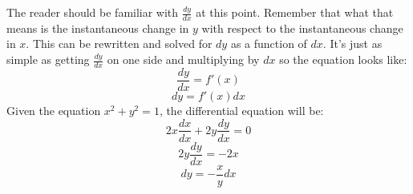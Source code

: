 \documentclass[../revisedmain.tex]{subfiles}
\begin{document}
	The reader should be familiar with $\displaystyle\frac{dy}{dx}$ at this point. Remember that what that means is the instantaneous change in $y$ with respect to the instantaneous change in $x$. This can be rewritten and solved for $dy$ as a function of $dx$. It's just as simple as getting $\displaystyle\frac{dy}{dx}$ on one side and multiplying by $dx$ so the equation looks like: $$\frac{dy}{dx}=f'(x)$$$$dy=f'(x)dx$$ Given the equation $x^2+y^2=1$, the differential equation will be: $$2x\frac{dx}{dx}+2y\frac{dy}{dx} = 0$$$$2y\frac{dy}{dx}=-2x$$$$dy=-\frac{x}{y}dx$$
\end{document}
